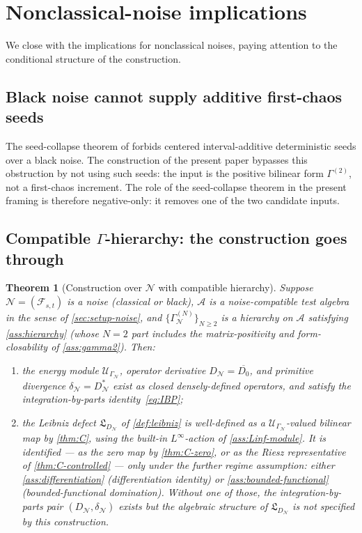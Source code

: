 \documentclass[11pt,reqno]{amsart}
\theoremstyle{plain}
\newtheorem{theorem}{Theorem}[section]
\theoremstyle{definition}
\theoremstyle{remark}
\newcommand{\cA}{\mathcal A}
\newcommand{\cF}{\mathcal F}
\newcommand{\cN}{\mathcal N}
\newcommand{\cU}{\mathcal U}
\newcommand{\dN}{D_{\cN}}
\newcommand{\divN}{\delta_{\cN}}
\newcommand{\Lleib}{\mathfrak L}
\begin{document}
\section{Nonclassical-noise implications}\label{sec:nonclassical}

We close with the implications for nonclassical noises, paying
attention to the conditional structure of the construction.

\subsection{Black noise cannot supply additive first-chaos seeds}\label{sec:nonclassical-no-seed}

The seed-collapse theorem of \cite[Thm.~5.6]{PrimitiveDivergence}
forbids centered interval-additive deterministic seeds over a
black noise. The construction of the present paper bypasses
this obstruction by not using such seeds: the input is the
positive bilinear form $\Gamma^{(2)}$, not a first-chaos
increment. The role of the seed-collapse theorem in the present
framing is therefore negative-only: it removes one of the two
candidate inputs.

\subsection{Compatible \texorpdfstring{$\Gamma$}{Gamma}-hierarchy: the construction goes through}\label{sec:nonclassical-yes}

\begin{theorem}[Construction over $\cN$ with compatible hierarchy]\label{thm:N-construction}
Suppose $\cN=(\cF_{s,t})$ is a noise (classical or black), $\cA$
is a noise-compatible test algebra in the sense of
\cref{sec:setup-noise}, and $\{\Gamma^{(N)}_{\cN}\}_{N\ge 2}$ is
a hierarchy on $\cA$ satisfying \cref{ass:hierarchy} (whose
$N=2$ part includes the matrix-positivity and form-closability
of \cref{ass:gamma2}). Then:
\begin{enumerate}
\item[$(\mathrm i)$] the energy module $\cU_{\Gamma_{\cN}}$,
operator derivative $\dN=\overline{D_{0}}$, and primitive
divergence $\divN=\dN^{*}$ exist as closed densely-defined
operators, and satisfy the integration-by-parts
identity~\eqref{eq:IBP};
\item[$(\mathrm{ii})$] the Leibniz defect $\Lleib_{\dN}$ of
\cref{def:leibniz} is well-defined as a $\cU_{\Gamma_{\cN}}$-valued
bilinear map by \cref{thm:C}, using the built-in
$L^{\infty}$-action of \cref{ass:Linf-module}. It is
identified --- as the zero map by \cref{thm:C-zero}, or as the
Riesz representative of \cref{thm:C-controlled} --- only under
the further regime assumption: either
\cref{ass:differentiation} (differentiation identity) or
\cref{ass:bounded-functional} (bounded-functional domination).
Without one of those, the integration-by-parts pair
$(\dN,\divN)$ exists but the algebraic structure of
$\Lleib_{\dN}$ is not specified by this construction.
\end{enumerate}
\end{theorem}
\end{document}
